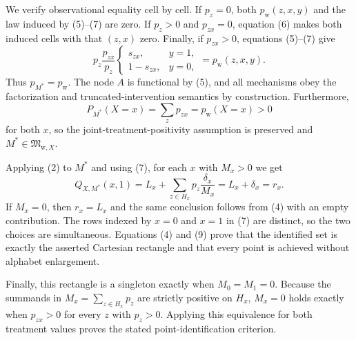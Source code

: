 We verify observational equality cell by cell.  If \(p_z=0\), both
\(p_{\mathrm w}(z,x,y)\) and the law induced by (5)--(7) are zero.  If
\(p_z>0\) and \(p_{zx}=0\), equation (6) makes both induced cells with that
\((z,x)\) zero.  Finally, if \(p_{zx}>0\), equations (5)--(7) give
\[
p_z\frac{p_{zx}}{p_z}
\begin{cases}s_{zx},&y=1,\\1-s_{zx},&y=0,
\end{cases}
=p_{\mathrm w}(z,x,y).
\tag{8}
\]
Thus \(p_{M^*}=p_{\mathrm w}\).  The node \(A\) is functional by (5), and
all mechanisms obey the factorization and truncated-intervention semantics
by construction.  Furthermore,
\[
P_{M^*}(X=x)=\sum_zp_{zx}=p_{\mathrm w}(X=x)>0
\]
for both \(x\), so the joint-treatment-positivity assumption is preserved and
\(M^*\in\mathfrak M_{\mathrm w,X}\).

Applying (2) to \(M^*\) and using (7), for each \(x\) with \(M_x>0\) we get
\[
Q_{X,M^*}(x,1)
=L_x+\sum_{z\in H_x}p_z\frac{\delta_x}{M_x}
=L_x+\delta_x=r_x.
\tag{9}
\]
If \(M_x=0\), then \(r_x=L_x\) and the same conclusion follows from (4)
with an empty contribution.  The rows indexed by \(x=0\) and \(x=1\) in
(7) are distinct, so the two choices are simultaneous.  Equations (4) and
(9) prove that the identified set is exactly the asserted Cartesian
rectangle and that every point is achieved without alphabet enlargement.

Finally, this rectangle is a singleton exactly when \(M_0=M_1=0\).  Because
the summands in \(M_x=\sum_{z\in H_x}p_z\) are strictly positive on \(H_x\),
\(M_x=0\) holds exactly when \(p_{zx}>0\) for every \(z\) with \(p_z>0\).
Applying this equivalence for both treatment values proves the stated
point-identification criterion.